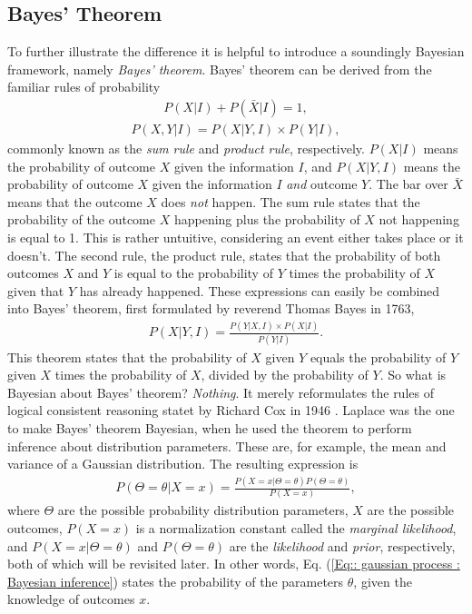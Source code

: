 \documentclass[twoside,english]{uiofysmaster}
\begin{document}
\subsection{Bayes' Theorem}

To further illustrate the difference it is helpful to introduce a soundingly Bayesian framework, namely \textit{Bayes' theorem}. Bayes' theorem can be derived from the familiar rules of probability
\begin{align}\label{Eq:: Sum rule}
P(X | I) + P(\bar{X} | I) = 1,
\end{align}
\begin{align}\label{Eq:: Product rule}
P(X, Y | I) = P(X | Y, I) \times P(Y | I),
\end{align} 
commonly known as the \textit{sum rule} and \textit{product rule}, respectively. $P(X|I)$ means the probability of outcome $X$ given the information $I$, and $P(X|Y,I)$ means the probability of outcome $X$ given the information $I$ \textit{and} outcome $Y$. The bar over $\bar{X}$ means that the outcome $X$ does \textit{not} happen. The sum rule states that the probability of the outcome $X$ happening plus the probability of $X$ not happening is equal to 1. This is rather untuitive, considering an event either takes place or it doesn't. The second rule, the product rule, states that the probability of both outcomes $X$ and $Y$ is equal to the probability of $Y$ times the probability of $X$ given that $Y$ has already happened. 
These expressions can easily be combined into Bayes' theorem, first formulated by reverend Thomas Bayes in 1763,
\begin{align}\label{Eq:: gaussian process : Bayes theorem}
P(X | Y, I) = \frac{P(Y | X, I) \times P(X | I)}{P(Y | I)}.
\end{align}
This theorem states that the probability of $X$ given $Y$ equals the probability of $Y$ given $X$ times the probability of $X$, divided by the probability of $Y$. So what is Bayesian about Bayes' theorem? \textit{Nothing}. It merely reformulates the rules of logical consistent reasoning statet by Richard Cox in 1946 \cite{sivia2006data}. Laplace was the one to make Bayes' theorem Bayesian, when he used the theorem to perform inference about distribution parameters. These are, for example, the mean and variance of a Gaussian distribution. The resulting expression is
\begin{align}
P(\Theta = \theta | X=x) = \frac{P(X=x|\Theta = \theta) P(\Theta = \theta)}{P(X=x)},\label{Eq:: gaussian process : Bayesian inference}
\end{align}
where $\Theta$ are the possible probability distribution parameters, $X$ are the possible outcomes, $P(X=x)$ is a normalization constant called the \textit{marginal likelihood}, and $P(X=x|\Theta = \theta)$  and $P(\Theta = \theta)$ are the \textit{likelihood} and \textit{prior}, respectively, both of which will be revisited later. In other words, Eq. (\ref{Eq:: gaussian process : Bayesian inference}) states the probability of the parameters $\theta$, given the knowledge of outcomes $x$.
\end{document}
